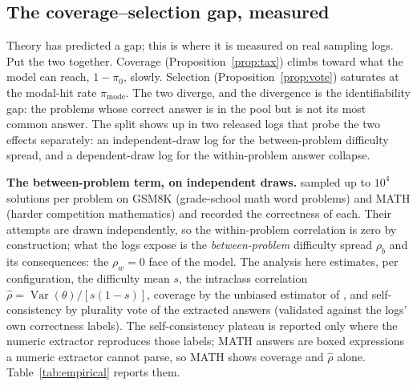 \documentclass[11pt]{article}
\newcommand{\Var}{\operatorname{Var}}
\begin{document}
\subsection{The coverage--selection gap, measured}
\label{sec:gap}

Theory has predicted a gap; this is where it is measured on real sampling logs. Put the two together. Coverage (Proposition~\ref{prop:tax}) climbs toward what the model can reach, $1-\pi_0$, slowly. Selection (Proposition~\ref{prop:vote}) saturates at the modal-hit rate $\pi_{\mathrm{mode}}$. The two diverge, and the divergence is the identifiability gap: the problems whose correct answer is in the pool but is not its most common answer. The split shows up in two released logs that probe the two effects separately: an independent-draw log for the between-problem difficulty spread, and a dependent-draw log for the within-problem answer collapse.

\textbf{The between-problem term, on independent draws.} \citet{brown2024monkeys} sampled up to $10^4$ solutions per problem on GSM8K \citep{cobbe2021gsm8k} (grade-school math word problems) and MATH \citep{hendrycks2021math} (harder competition mathematics) and recorded the correctness of each. Their attempts are drawn independently, so the within-problem correlation is zero by construction; what the logs expose is the \emph{between-problem} difficulty spread $\rho_b$ and its consequences: the $\rho_w=0$ face of the model. The analysis here estimates, per configuration, the difficulty mean $s$, the intraclass correlation $\hat\rho = \Var(\theta)/[s(1-s)]$, coverage by the unbiased estimator of \citet{chen2021codex}, and self-consistency by plurality vote of the extracted answers (validated against the logs' own correctness labels). The self-consistency plateau is reported only where the numeric extractor reproduces those labels; MATH answers are boxed expressions a numeric extractor cannot parse, so MATH shows coverage and $\hat\rho$ alone. Table~\ref{tab:empirical} reports them.
\end{document}
